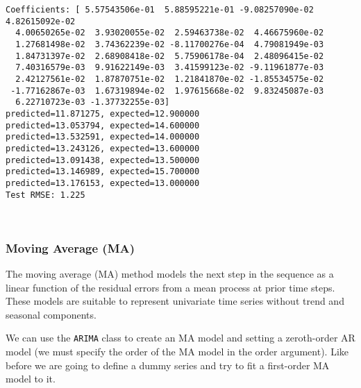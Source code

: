 \documentclass[11pt]{article}
\begin{document}
    \begin{Verbatim}[commandchars=\\\{\}]
Coefficients: [ 5.57543506e-01  5.88595221e-01 -9.08257090e-02  4.82615092e-02
  4.00650265e-02  3.93020055e-02  2.59463738e-02  4.46675960e-02
  1.27681498e-02  3.74362239e-02 -8.11700276e-04  4.79081949e-03
  1.84731397e-02  2.68908418e-02  5.75906178e-04  2.48096415e-02
  7.40316579e-03  9.91622149e-03  3.41599123e-02 -9.11961877e-03
  2.42127561e-02  1.87870751e-02  1.21841870e-02 -1.85534575e-02
 -1.77162867e-03  1.67319894e-02  1.97615668e-02  9.83245087e-03
  6.22710723e-03 -1.37732255e-03]
predicted=11.871275, expected=12.900000
predicted=13.053794, expected=14.600000
predicted=13.532591, expected=14.000000
predicted=13.243126, expected=13.600000
predicted=13.091438, expected=13.500000
predicted=13.146989, expected=15.700000
predicted=13.176153, expected=13.000000
Test RMSE: 1.225
    \end{Verbatim}

    \begin{center}
    \end{center}
    { \hspace*{\fill} \\}
    
    \hypertarget{moving-average-ma}{%
\subsubsection{Moving Average (MA)}\label{moving-average-ma}}

The moving average (MA) method models the next step in the sequence as a
linear function of the residual errors from a mean process at prior time
steps. These models are suitable to represent univariate time series
without trend and seasonal components.

We can use the \texttt{ARIMA} class to create an MA model and setting a
zeroth-order AR model (we must specify the order of the MA model in the
order argument). Like before we are going to define a dummy series and
try to fit a first-order MA model to it.
\end{document}
